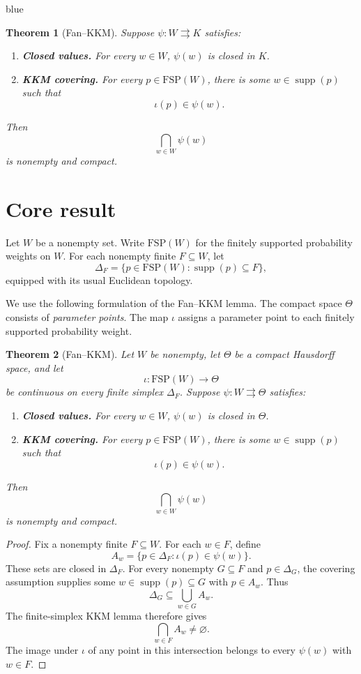 \documentclass[11pt]{article}
\newtheorem{theorem}{Theorem}[section]
\theoremstyle{definition}
\theoremstyle{remark}
\newcommand{\supp}{\operatorname{supp}}
\newenvironment{AIwritten}{\begin{color}{blue}}{\end{color}}
\begin{document}
\begin{AIwritten}
\begin{theorem}[Fan--KKM]
	Suppose $\psi:W\rightrightarrows K$ satisfies:
	\begin{enumerate}
		\item \textbf{Closed values.}
		For every $w\in W$, $\psi(w)$ is closed in $K$.
		
		\item \textbf{KKM covering.}
		For every $p\in\mathrm{FSP}(W)$, there is
		some $w\in\supp(p)$ such that
		\[
		\iota(p)\in\psi(w).
		\]
	\end{enumerate}
	Then
	\[
	\bigcap_{w\in W}\psi(w)
	\]
	is nonempty and compact.
\end{theorem}




\section{Core result}

Let $W$ be a nonempty set. Write $\mathrm{FSP}(W)$
for the finitely supported probability weights on $W$.
For each nonempty finite $F\subseteq W$, let
\[
\Delta_F=\{p\in\mathrm{FSP}(W):\supp(p)\subseteq F\},
\]
equipped with its usual Euclidean topology.

We use the following formulation of the Fan--KKM lemma.
The compact space $\Theta$ consists of \emph{parameter points}.
The map $\iota$ assigns a parameter point to each
finitely supported probability weight.

\begin{theorem}[Fan--KKM]\label{thm:KKM}
	Let $W$ be nonempty, let $\Theta$ be a compact Hausdorff
	space, and let
	\[
	\iota:\mathrm{FSP}(W)\to \Theta
	\]
	be continuous on every finite simplex $\Delta_F$.
	Suppose $\psi:W\rightrightarrows \Theta$ satisfies:
	\begin{enumerate}
		\item \textbf{Closed values.}
		For every $w\in W$, $\psi(w)$ is closed in $\Theta$.
		
		\item \textbf{KKM covering.}
		For every $p\in\mathrm{FSP}(W)$, there is some
		$w\in\supp(p)$ such that
		\[
		\iota(p)\in\psi(w).
		\]
	\end{enumerate}
	Then
	\[
	\bigcap_{w\in W}\psi(w)
	\]
	is nonempty and compact.
\end{theorem}

\begin{proof}
	Fix a nonempty finite $F\subseteq W$.
	For each $w\in F$, define
	\[
	A_w=\{p\in\Delta_F:\iota(p)\in\psi(w)\}.
	\]
	These sets are closed in $\Delta_F$.
	For every nonempty $G\subseteq F$ and $p\in\Delta_G$,
	the covering assumption supplies some
	$w\in\supp(p)\subseteq G$ with $p\in A_w$.
	Thus
	\[
	\Delta_G\subseteq\bigcup_{w\in G}A_w.
	\]
	The finite-simplex KKM lemma therefore gives
	\[
	\bigcap_{w\in F}A_w\ne\varnothing.
	\]
	The image under $\iota$ of any point in this
	intersection belongs to every $\psi(w)$ with $w\in F$.
	

\end{proof}
\end{AIwritten}
\end{document}
